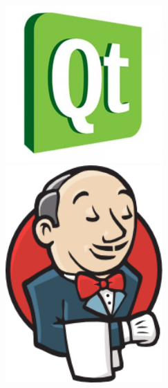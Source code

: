 \begin{frame}
\begin{columns}[T]
\begin{column}{.3\textwidth}
			\includegraphics[width=0.45\textwidth]{images/qt.jpg}\\
			\includegraphics[width=0.45\textwidth]{images/jenkins.png}\\
		\end{column}
	\end{columns}
\end{frame}